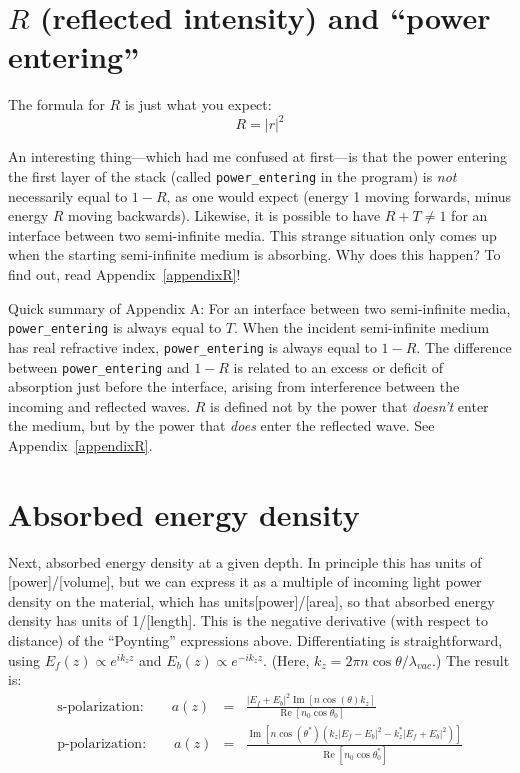 \documentclass[12pt]{article}
\newcommand{\bea}{\begin{eqnarray*}} %
\newcommand{\eea}{\end{eqnarray*}} %
\renewcommand{\(}{\left(}
\renewcommand{\)}{\right)}
\renewcommand{\Im}{\operatorname{Im}}
\renewcommand{\Re}{\operatorname{Re}}
\begin{document}
\section{$R$ (reflected intensity) and ``power entering''}

The formula for $R$ is just what you expect:
$$R=|r|^2$$

An interesting thing---which had me confused at first---is that the power entering the first layer of the stack (called \verb=power_entering= in the program) is \emph{not} necessarily equal to $1-R$, as one would expect (energy 1 moving forwards, minus energy $R$ moving backwards). Likewise, it is possible to have $R+T\neq 1$ for an interface between two semi-infinite media. This strange situation only comes up when the starting semi-infinite medium is absorbing. Why does this happen? To find out, read Appendix~\ref{appendixR}!

Quick summary of Appendix A: For an interface between two semi-infinite media, \verb=power_entering= is always equal to $T$. When the incident semi-infinite medium has real refractive index, \verb=power_entering= is always equal to $1-R$. The difference between \verb=power_entering= and $1-R$ is related to an excess or deficit of absorption just before the interface, arising from interference between the incoming and reflected waves. $R$ is defined not by the power that \emph{doesn't} enter the medium, but by the power that \emph{does} enter the reflected wave. See Appendix~\ref{appendixR}.

\section{Absorbed energy density}
Next, absorbed energy density at a given depth. In principle this has units of [power]/[volume], but we can express it as a multiple of incoming light power density on the material, which has units[power]/[area], so that absorbed energy density has units of 1/[length]. This is the negative derivative (with respect to distance) of the ``Poynting'' expressions above. Differentiating is straightforward, using $E_f(z) \propto e^{i k_z z}$ and $E_b(z) \propto e^{-i k_z z}$. (Here, $k_z=2\pi n\cos\theta/\lambda_{vac}$.) The result is:
\bea
\text{s-polarization:} \qquad a(z) &=& \frac{|E_f+E_b|^2 \Im\left[ n \cos(\theta) k_z\right] }{\Re\left[ n_0 \cos \theta_0 \right] } \\
\text{p-polarization:} \qquad a(z) &=& \frac{\Im\left[ n \cos(\theta^*)\(k_z|E_f-E_b|^2-k_z^*|E_f+E_b|^2\)\right]}{\Re \left[ n_0 \cos \theta_0^* \right] }
\eea
\end{document}
